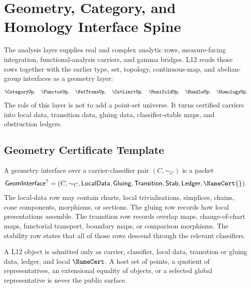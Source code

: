 \chapter{Geometry, Category, and Homology Interface Spine}
\label{ch:visions-geometry-category-homology-spine}

The analysis layer supplies real and complex analytic rows, measure-facing
integration, functional-analysis carriers, and gamma bridges.  L12 reads
those rows together with the earlier type, set, topology, continuous-map, and
abelian-group interfaces as a geometry layer:
$$
\CategoryUp,\quad
\FunctorUp,\quad
\NatTransUp,\quad
\CatLimitUp,\quad
\ManifoldUp,\quad
\BundleUp,\quad
\HomologyUp.
$$
The role of this layer is not to add a point-set universe.  It turns certified
carriers into local data, transition data, gluing data, classifier-stable
maps, and obstruction ledgers.

\section{Geometry Certificate Template}
\label{sec:geometry-spine-template}

\begin{definition}
\label{def:geometry-spine-interface}
A geometry interface over a carrier-classifier pair $(C,\sim_C)$ is a packet
$$
\mathsf{GeomInterface}^{\uparrow}
=
(C,\sim_C,\mathsf{LocalData},\mathsf{Gluing},
\mathsf{Transition},\mathsf{Stab},\mathsf{Ledger},\NameCert{}).
$$
The local-data row may contain charts, local trivialisations, simplices,
chains, cone components, morphisms, or sections.  The gluing row records how
local presentations assemble.  The transition row records overlap maps,
change-of-chart maps, functorial transport, boundary maps, or comparison
morphisms.  The stability row states that all of those rows descend through
the relevant classifiers.
\end{definition}

\begin{principle}
\label{prin:geometry-spine-not-point-set}
A L12 object is admitted only as carrier, classifier, local data,
transition or gluing data, ledger, and local $\NameCert$.  A host set of
points, a quotient of representatives, an extensional equality of objects, or
a selected global representative is never the public surface.
\end{principle}

